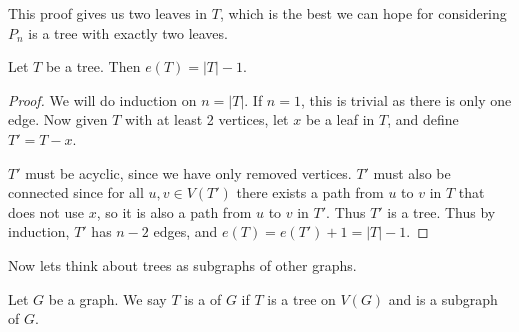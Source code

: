 \documentclass[a4paper]{scrreprt}
\begin{document}
\begin{remark}
	This proof gives us two leaves in $T$, which is the best we can hope for considering $P_n$ is a tree with exactly two leaves.
\end{remark}

\begin{proposition}
	Let $T$ be a tree. Then $e(T) = |T| - 1$.
\end{proposition}
\begin{proof}
	We will do induction on $n = |T|$. If $n = 1$, this is trivial as there is only one edge. Now given $T$ with at least 2 vertices, let $x$ be a leaf in $T$, and define $T' = T - x$.
	
	$T'$ must be acyclic, since we have only removed vertices. $T'$ must also be connected since for all $u, v \in V(T')$ there exists a path from $u$ to $v$ in $T$ that does not use $x$, so it is also a path from $u$ to $v$ in $T'$. Thus $T'$ is a tree.
	Thus by induction, $T'$ has $n - 2$ edges, and $e(T) = e(T') + 1 = |T| - 1$. 
\end{proof}

Now lets think about trees as subgraphs of other graphs.

\begin{definition}
	Let $G$ be a graph. We say $T$ is a  of $G$ if $T$ is a tree on $V(G)$ and is a subgraph of $G$.
\end{definition}
\end{document}

